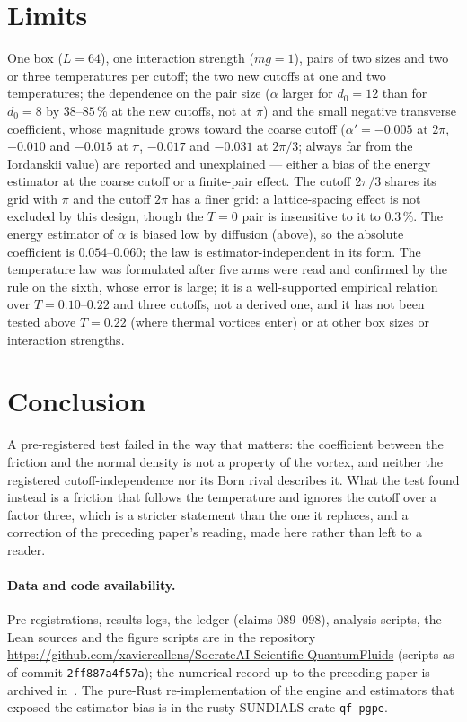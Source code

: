 \documentclass[11pt,a4paper]{article}
\begin{document}
\section{Limits}\label{sec:limits}

One box ($L=64$), one interaction strength ($mg=1$), pairs of two sizes and two or three temperatures per cutoff; the two new cutoffs at one and two temperatures; the dependence on the pair size ($\alpha$ larger for $d_0=12$ than for $d_0=8$ by $38$--$85\,\%$ at the new cutoffs, not at $\pi$) and the small negative transverse coefficient, whose magnitude grows toward the coarse cutoff ($\alpha'=-0.005$ at $2\pi$, $-0.010$ and $-0.015$ at $\pi$, $-0.017$ and $-0.031$ at $2\pi/3$; always far from the Iordanskii value) are reported and unexplained --- either a bias of the energy estimator at the coarse cutoff or a finite-pair effect. The cutoff $2\pi/3$ shares its grid with $\pi$ and the cutoff $2\pi$ has a finer grid: a lattice-spacing effect is not excluded by this design, though the $T=0$ pair is insensitive to it to $0.3\,\%$.
The energy estimator of $\alpha$ is biased low by diffusion (above), so the absolute coefficient is $0.054$--$0.060$; the law is estimator-independent in its form. The temperature law was formulated after five arms were read and confirmed by the rule on the sixth, whose error is large; it is a well-supported empirical relation over $T=0.10$--$0.22$ and three cutoffs, not a derived one, and it has not been tested above $T=0.22$ (where thermal vortices enter) or at other box sizes or interaction strengths.

\section{Conclusion}

A pre-registered test failed in the way that matters: the coefficient between the friction and the normal density is not a property of the vortex, and neither the registered cutoff-independence nor its Born rival describes it. What the
test found instead is a friction that follows the temperature and ignores the cutoff over a factor three, which
is a stricter statement than the one it replaces, and a correction of the preceding paper's reading, made here rather than left to a reader.

\paragraph{Data and code availability.} Pre-registrations, results logs, the ledger (claims 089--098), analysis scripts, the Lean sources and the figure scripts are in the repository \url{https://github.com/xaviercallens/SocrateAI-Scientific-QuantumFluids} (scripts as of commit \texttt{2ff887a4f57a}); the numerical record up to the preceding paper is archived in~\cite{Callens2026sw}. The pure-Rust re-implementation of the engine and estimators that exposed the estimator bias is in the rusty-SUNDIALS crate \texttt{qf-pgpe}.
\end{document}
